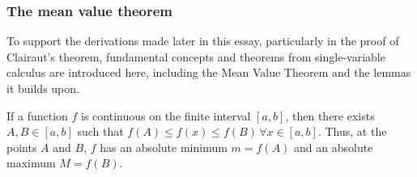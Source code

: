 \subsubsection{The mean value theorem}\label{section:MVT}
To support the derivations made later in this essay, particularly in the proof of Clairaut's theorem, fundamental
concepts and theorems from single-variable calculus are introduced here, including the Mean Value Theorem and the lemmas it builds upon.
\begin{theorem}\label{lemma:MINMAX}
	If a function $f$ is continuous on the finite interval $[a,b]$, then there exists $A,B\in[a,b]$ such that $f(A)\leq f(x)\leq f(B)\,\forall x\in[a,b]$.
	Thus, at the points $A$ and $B$, $f$ has an absolute minimum $m=f(A)$ and an absolute maximum $M=f(B)$.
\end{theorem}
